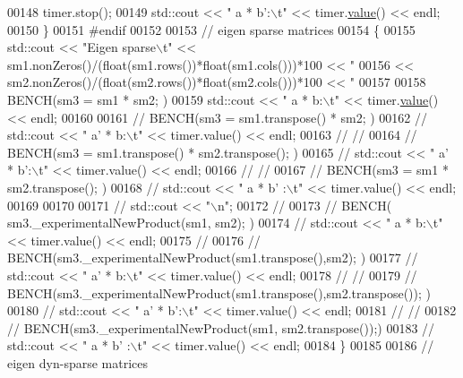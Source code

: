 \begin{DoxyCode}
{00148       timer.stop();
00149       std::cout << \textcolor{stringliteral}{"   a * b':\(\backslash\)t"} << timer.\hyperlink{class_eigen_1_1_bench_timer_a26760f963ed8b64c126159bfea57735e}{value}() << endl;
00150     \}
00151 \textcolor{preprocessor}{    #endif}
00152 
00153     \textcolor{comment}{// eigen sparse matrices}
00154     \{
00155       std::cout << \textcolor{stringliteral}{"Eigen sparse\(\backslash\)t"} << sm1.nonZeros()/(float(sm1.rows())*\textcolor{keywordtype}{float}(sm1.cols()))*100 << \textcolor{stringliteral}{"%
00156                 << sm2.nonZeros()/(float(sm2.rows())*\textcolor{keywordtype}{float}(sm2.cols()))*100 << \textcolor{stringliteral}{"%
00157 
00158       BENCH(sm3 = sm1 * sm2; )
00159       std::cout << \textcolor{stringliteral}{"   a * b:\(\backslash\)t"} << timer.\hyperlink{class_eigen_1_1_bench_timer_a26760f963ed8b64c126159bfea57735e}{value}() << endl;
00160 
00161 \textcolor{comment}{//       BENCH(sm3 = sm1.transpose() * sm2; )}
00162 \textcolor{comment}{//       std::cout << "   a' * b:\(\backslash\)t" << timer.value() << endl;}
00163 \textcolor{comment}{// //}
00164 \textcolor{comment}{//       BENCH(sm3 = sm1.transpose() * sm2.transpose(); )}
00165 \textcolor{comment}{//       std::cout << "   a' * b':\(\backslash\)t" << timer.value() << endl;}
00166 \textcolor{comment}{// //}
00167 \textcolor{comment}{//       BENCH(sm3 = sm1 * sm2.transpose(); )}
00168 \textcolor{comment}{//       std::cout << "   a * b' :\(\backslash\)t" << timer.value() << endl;}
00169 
00170 
00171 \textcolor{comment}{//       std::cout << "\(\backslash\)n";}
00172 \textcolor{comment}{//}
00173 \textcolor{comment}{//       BENCH( sm3.\_experimentalNewProduct(sm1, sm2); )}
00174 \textcolor{comment}{//       std::cout << "   a * b:\(\backslash\)t" << timer.value() << endl;}
00175 \textcolor{comment}{//}
00176 \textcolor{comment}{//       BENCH(sm3.\_experimentalNewProduct(sm1.transpose(),sm2); )}
00177 \textcolor{comment}{//       std::cout << "   a' * b:\(\backslash\)t" << timer.value() << endl;}
00178 \textcolor{comment}{// //}
00179 \textcolor{comment}{//       BENCH(sm3.\_experimentalNewProduct(sm1.transpose(),sm2.transpose()); )}
00180 \textcolor{comment}{//       std::cout << "   a' * b':\(\backslash\)t" << timer.value() << endl;}
00181 \textcolor{comment}{// //}
00182 \textcolor{comment}{//       BENCH(sm3.\_experimentalNewProduct(sm1, sm2.transpose());)}
00183 \textcolor{comment}{//       std::cout << "   a * b' :\(\backslash\)t" << timer.value() << endl;}
00184     \}
00185 
00186     \textcolor{comment}{// eigen dyn-sparse matrices}
}}}
\end{DoxyCode}
